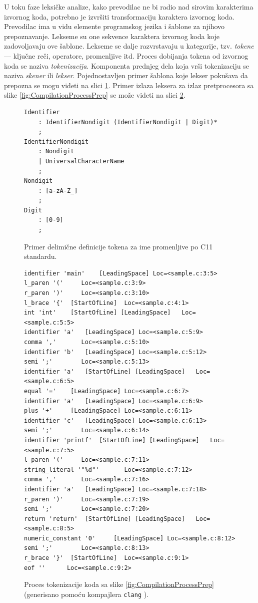 U toku faze leksičke analize, kako prevodilac ne bi radio nad sirovim karakterima izvornog koda, potrebno je izvršiti transformaciju karaktera izvornog koda. Prevodilac ima u vidu elemente programskog jezika i šablone za njihovo prepoznavanje. Lekseme su one sekvence karaktera izvornog koda koje zadovoljavaju ove šablone. Lekseme se dalje razvrstavaju u kategorije, tzv. \emph{tokene} --- ključne reči, operatore, promenljive itd. Proces dobijanja tokena od izvornog koda se naziva \emph{tokenizacija}. Komponenta prednjeg dela koja vrši tokenizaciju se naziva \emph{skener} ili \emph{lekser}. Pojednostavljen primer šablona koje lekser pokušava da prepozna se mogu videti na slici \ref{fig:CLexerExample}. Primer izlaza leksera za izlaz pretprocesora sa slike \ref{fig:CompilationProcessPrep} se može videti na slici \ref{fig:CompilationProcessLex}.

\begin{figure}[h!]
\begin{lstlisting}[language={}]
Identifier 
    : IdentifierNondigit (IdentifierNondigit | Digit)*
    ;
IdentifierNondigit  
    : Nondigit
    | UniversalCharacterName
    ;
Nondigit 
    : [a-zA-Z_]
    ;
Digit 
    : [0-9]
    ;
\end{lstlisting}
\caption{Primer delimične definicije tokena za ime promenljive po C11 standardu.}
\label{fig:CLexerExample}
\end{figure}

\begin{figure}[h!]
\begin{lstlisting}[language={}]
identifier 'main'	 [LeadingSpace]	Loc=<sample.c:3:5>
l_paren '('		Loc=<sample.c:3:9>
r_paren ')'		Loc=<sample.c:3:10>
l_brace '{'	 [StartOfLine]	Loc=<sample.c:4:1>
int 'int'	 [StartOfLine] [LeadingSpace]	Loc=<sample.c:5:5>
identifier 'a'	 [LeadingSpace]	Loc=<sample.c:5:9>
comma ','		Loc=<sample.c:5:10>
identifier 'b'	 [LeadingSpace]	Loc=<sample.c:5:12>
semi ';'		Loc=<sample.c:5:13>
identifier 'a'	 [StartOfLine] [LeadingSpace]	Loc=<sample.c:6:5>
equal '='	 [LeadingSpace]	Loc=<sample.c:6:7>
identifier 'a'	 [LeadingSpace]	Loc=<sample.c:6:9>
plus '+'	 [LeadingSpace]	Loc=<sample.c:6:11>
identifier 'c'	 [LeadingSpace]	Loc=<sample.c:6:13>
semi ';'		Loc=<sample.c:6:14>
identifier 'printf'	 [StartOfLine] [LeadingSpace]	Loc=<sample.c:7:5>
l_paren '('		Loc=<sample.c:7:11>
string_literal '"%d"'		Loc=<sample.c:7:12>
comma ','		Loc=<sample.c:7:16>
identifier 'a'	 [LeadingSpace]	Loc=<sample.c:7:18>
r_paren ')'		Loc=<sample.c:7:19>
semi ';'		Loc=<sample.c:7:20>
return 'return'	 [StartOfLine] [LeadingSpace]	Loc=<sample.c:8:5>
numeric_constant '0'	 [LeadingSpace]	Loc=<sample.c:8:12>
semi ';'		Loc=<sample.c:8:13>
r_brace '}'	 [StartOfLine]	Loc=<sample.c:9:1>
eof ''		Loc=<sample.c:9:2>
\end{lstlisting}
\caption{Proces tokenizacije koda sa slike \ref{fig:CompilationProcessPrep} (generisano pomoću kompajlera \texttt{clang} \cite{Clang}).}
\label{fig:CompilationProcessLex}
\end{figure}

